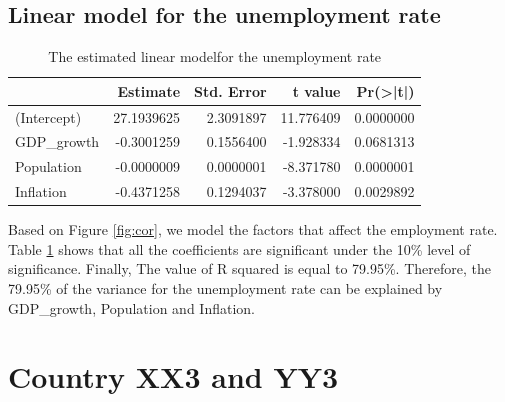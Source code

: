 \documentclass[11pt,a4paper,]{article}
\begin{document}
\subsection{Linear model for the unemployment rate}

\begin{table}[H]

\caption{\label{tab:model}The estimated linear modelfor the unemployment rate}
\centering
\begin{tabular}[t]{lrrrr}
\toprule
  & Estimate & Std. Error & t value & Pr(>|t|)\\
\midrule
(Intercept) & 27.1939625 & 2.3091897 & 11.776409 & 0.0000000\\
GDP\_growth & -0.3001259 & 0.1556400 & -1.928334 & 0.0681313\\
Population & -0.0000009 & 0.0000001 & -8.371780 & 0.0000001\\
Inflation & -0.4371258 & 0.1294037 & -3.378000 & 0.0029892\\
\bottomrule
\end{tabular}
\end{table}

Based on Figure \ref{fig:cor}, we model the factors that affect the employment rate. Table \ref{tab:model} shows that all the coefficients are significant under the 10\% level of significance. Finally, The value of R squared is equal to 79.95\%. Therefore, the 79.95\% of the variance for the unemployment rate can be explained by GDP\_growth, Population and Inflation.

\section{Country XX3 and YY3}

\textcite{basiceducation}
\textcite{advancededucation}

\printbibliography
\end{document}
